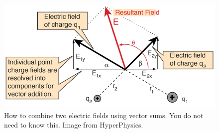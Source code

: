 \begin{figure}
    \centering
    \includegraphics{Figures/electric_field_superposition.png}
    \caption{How to combine two electric fields using vector sums.
    You do not need to know this.
    Image from HyperPhysics.
        \cite{hyperphysics}
    }
    \label{fig:electric_field_superposition}
\end{figure}
